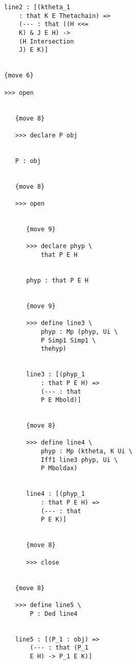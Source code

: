 \documentclass[12pt]{article}
\begin{document}
\begin{verbatim}
                     line2 : [(ktheta_1 
                         : that K E Thetachain) => 
                         (--- : that ((H <<= 
                         K) & J E H) -> 
                         (H Intersection 
                         J) E K)]


                     {move 6}

                     >>> open


                        {move 8}

                        >>> declare P obj


                        P : obj


                        {move 8}

                        >>> open


                           {move 9}

                           >>> declare phyp \
                               that P E H


                           phyp : that P E H


                           {move 9}

                           >>> define line3 \
                               phyp : Mp (phyp, Ui \
                               P Simp1 Simp1 \
                               thehyp)


                           line3 : [(phyp_1 
                               : that P E H) => 
                               (--- : that 
                               P E Mbold)]


                           {move 8}

                           >>> define line4 \
                               phyp : Mp (ktheta, K Ui \
                               Iff1 line3 phyp, Ui \
                               P Mboldax)


                           line4 : [(phyp_1 
                               : that P E H) => 
                               (--- : that 
                               P E K)]


                           {move 8}

                           >>> close


                        {move 8}

                        >>> define line5 \
                            P : Ded line4


                        line5 : [(P_1 : obj) => 
                            (--- : that (P_1 
                            E H) -> P_1 E K)]



\end{verbatim}
\end{document}
